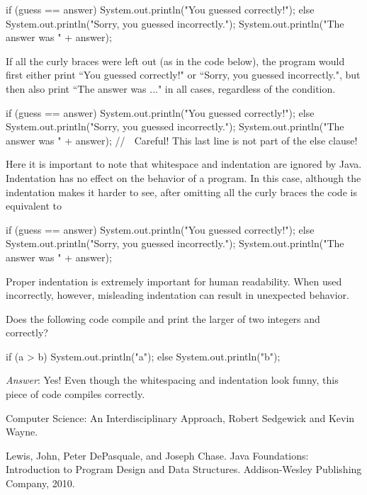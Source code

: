 \begin{code}
if (guess == answer)
    System.out.println("You guessed correctly!");
else 
{
    System.out.println("Sorry, you guessed incorrectly.");
    System.out.println("The answer was " + answer);
} 
\end{code}

\noindent If all the curly braces were left out (as in the code below), the program would first either print ``You guessed correctly!" or ``Sorry, you guessed incorrectly.", but then also print ``The answer was ..." in all cases, regardless of the condition.

\begin{code}
if (guess == answer)
    System.out.println("You guessed correctly!");
else
    System.out.println("Sorry, you guessed incorrectly.");
    System.out.println("The answer was " + answer); 
    // ^^^ Careful! This last line is not part of the else clause!
\end{code}

Here it is important to note that whitespace and indentation are ignored by Java. Indentation has no effect on the behavior of a program. In this case, although the indentation makes it harder to see, after omitting all the curly braces the code is equivalent to 

\begin{code}
if (guess == answer){
    System.out.println("You guessed correctly!");
} else {
    System.out.println("Sorry, you guessed incorrectly.");
}
System.out.println("The answer was " + answer); 
\end{code}

Proper indentation is extremely important for human readability. When used incorrectly, however, misleading indentation can result in unexpected behavior.

\begin{example}
Does the following code compile and print the larger of two integers  and  correctly?

\begin{code}
if (a > b)      System.out.println("a");
else {
System.out.println("b");
}
\end{code}

\emph{Answer}: Yes! Even though the whitespacing and indentation look funny, this piece of code compiles correctly.
\end{example}

Computer Science: An Interdisciplinary Approach, Robert Sedgewick and Kevin Wayne.

Lewis, John, Peter DePasquale, and Joseph Chase. Java Foundations: Introduction to Program Design and Data Structures. Addison-Wesley Publishing Company, 2010.